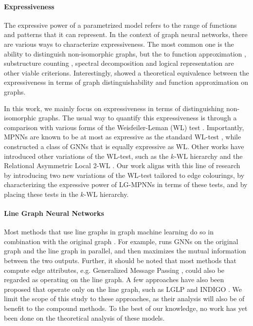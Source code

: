 \documentclass{article}
\begin{document}
\paragraph{Expressiveness}
The expressive power of a parametrized model refers to the range of functions and patterns that it can represent. 
In the context of graph neural networks, there are various ways to characterize expressiveness. The most common one is the ability to distinguish non-isomorphic graphs, but the to function approximation \cite{maron2019universality}, substructure counting \cite{chen2020can}, spectral decomposition \cite{balcilar2020analyzing} and logical representation \cite{barcelo2020logical} are other viable criterions. Interestingly, \cite{chen2019equivalence} showed a theoretical equivalence between the expressiveness in terms of graph distinguishability and function approximation on graphs.

In this work, we mainly focus on expressiveness in terms of distinguishing non-isomorphic graphs.
The usual way to quantify this expressiveness is through a comparison with various forms of the Weisfeiler-Leman (WL) test \cite{weisfeiler1968reduction}. Importantly, MPNNs are known to be at most as expressive as the standard WL-test \cite{morris2019weisfeiler}, while \cite{xu2018powerful} constructed a class of GNNs that is equally expressive as WL. Other works have introduced other variations of the WL-test, such as the $k$-WL hierarchy \cite{morris2019weisfeiler} and the Relational Asymmetric Local 2-WL \cite{huang2024theory}.
Our work aligns with this line of research by introducing two new variations of the WL-test tailored to edge colourings, by characterizing the expressive power of LG-MPNNs in terms of these tests, and by placing these tests in the $k$-WL hierarchy.



\paragraph{Line Graph Neural Networks}
Most methods that use line graphs in graph machine learning do so in combination with the original graph \cite{choudhary2021atomistic,chen2017supervised,jiang2019censnet,zhang2023line}. For example, \cite{zhang2023line} runs GNNs on the original graph and the line graph in parallel, and then maximizes the mutual information between the two outputs.
Further, it should be noted that most methods that compute edge attributes, e.g. 
Generalized Message Passing \cite{battaglia2018relational}, could also be regarded as operating on the line graph.
A few approaches have also been proposed that operate only on the line graph, such as LGLP \cite{cai2021line} and INDIGO \cite{liu2021indigo}.
We limit the scope of this study to these approaches, as their analysis will also be of benefit to the compound methods. To the best of our knowledge, no work has yet been done on the theoretical analysis of these models.
\end{document}
